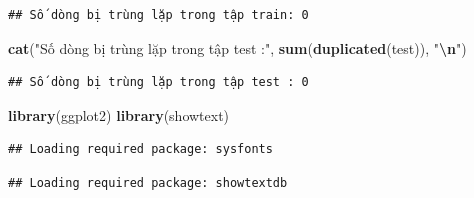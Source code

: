 \documentclass[
]{article}
\newenvironment{Shaded}{\begin{snugshade}}{\end{snugshade}}
\newcommand{\FunctionTok}[1]{\textcolor[rgb]{0.13,0.29,0.53}{\textbf{#1}}}
\newcommand{\NormalTok}[1]{#1}
\newcommand{\SpecialCharTok}[1]{\textcolor[rgb]{0.81,0.36,0.00}{\textbf{#1}}}
\newcommand{\StringTok}[1]{\textcolor[rgb]{0.31,0.60,0.02}{#1}}
\begin{document}
\begin{verbatim}
## Số dòng bị trùng lặp trong tập train: 0
\end{verbatim}

\begin{Shaded}
\begin{Highlighting}[]
\FunctionTok{cat}\NormalTok{(}\StringTok{"Số dòng bị trùng lặp trong tập test :"}\NormalTok{, }\FunctionTok{sum}\NormalTok{(}\FunctionTok{duplicated}\NormalTok{(test)), }\StringTok{"}\SpecialCharTok{\textbackslash{}n}\StringTok{"}\NormalTok{)}
\end{Highlighting}
\end{Shaded}

\begin{verbatim}
## Số dòng bị trùng lặp trong tập test : 0
\end{verbatim}

\begin{Shaded}
\begin{Highlighting}[]
\FunctionTok{library}\NormalTok{(ggplot2)}
\FunctionTok{library}\NormalTok{(showtext)}
\end{Highlighting}
\end{Shaded}

\begin{verbatim}
## Loading required package: sysfonts
\end{verbatim}

\begin{verbatim}
## Loading required package: showtextdb
\end{verbatim}
\end{document}

